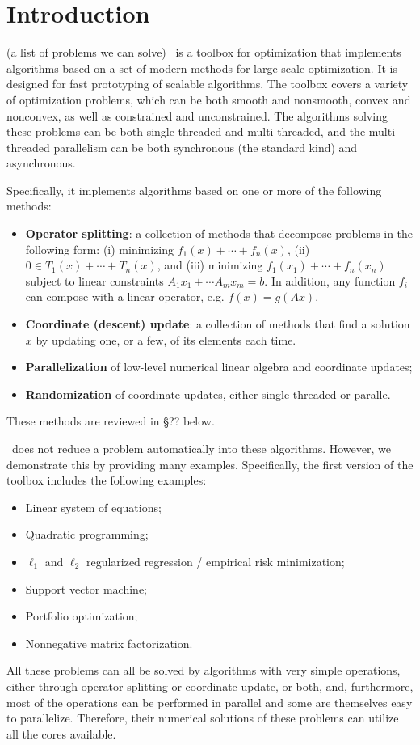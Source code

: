 \section{Introduction}
(a list of problems we can solve)
\pkg~is a toolbox for optimization that implements algorithms based on a set of modern methods for large-scale optimization. It is designed for fast prototyping of scalable algorithms. The toolbox covers a variety of optimization problems, which can  be both smooth and nonsmooth, convex and nonconvex, as well as constrained and unconstrained.  The algorithms solving these problems can be both single-threaded and multi-threaded, and the multi-threaded parallelism can be both synchronous (the standard kind) and asynchronous.  

Specifically, it implements  algorithms based on one or more of the following methods:
\begin{itemize}
\item \textbf{Operator splitting}: a collection of methods that decompose problems in the following form: (i) minimizing $f_1(x)+\cdots+f_n(x)$, (ii) $0\in T_1(x)+\cdots +T_n(x)$, and (iii) minimizing $f_1(x_1)+\cdots+f_n(x_n)$ subject to linear constraints $A_1 x_1+\cdots A_m x_m=b$. In addition, any function $f_i$ can compose with a linear operator, e.g. $f(x) = g(Ax)$.

\item \textbf{Coordinate (descent) update}: a collection of methods that find a solution $x$ by updating one, or a few, of its elements each time.
\item \textbf{Parallelization} of low-level numerical linear algebra and coordinate updates;
\item  \textbf{Randomization} of coordinate updates, either single-threaded or paralle.
\end{itemize}
These methods are reviewed in \S?? below.

\pkg~does not reduce a problem automatically into these algorithms. However, we demonstrate this by  providing many examples. Specifically, the first version of the toolbox includes the following examples:
\begin{itemize}
\item Linear system of equations;
\item Quadratic programming;
\item $\ell_1$ and $\ell_2$ regularized  regression / empirical risk minimization;
\item Support vector machine;
\item Portfolio optimization;
\item Nonnegative matrix factorization.
\end{itemize}
All these  problems can all be solved by algorithms with very simple operations, either through operator splitting or coordinate update, or both, and, furthermore, most of the operations can be performed in parallel and some are themselves easy to parallelize. Therefore, their numerical solutions of these problems can utilize all the cores available.

